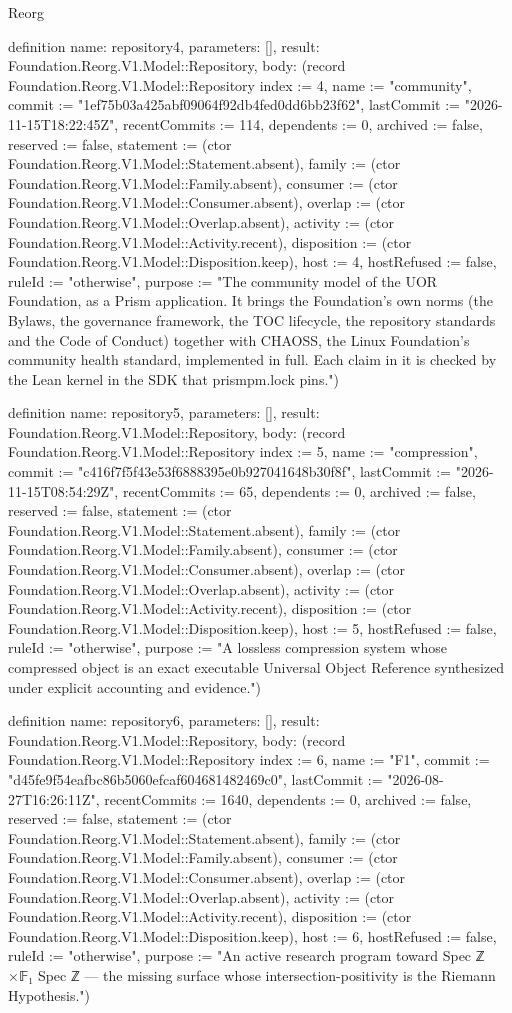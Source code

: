 \begin{lexlean}{Reorg}
\begin{semanticmodule}
definition{
  name: repository4,
  parameters: [],
  result: Foundation.Reorg.V1.Model::Repository,
  body: (record Foundation.Reorg.V1.Model::Repository {index := 4, name := "community", commit := "1ef75b03a425abf09064f92db4fed0dd6bb23f62", lastCommit := "2026-11-15T18:22:45Z", recentCommits := 114, dependents := 0, archived := false, reserved := false, statement := (ctor Foundation.Reorg.V1.Model::Statement.absent), family := (ctor Foundation.Reorg.V1.Model::Family.absent), consumer := (ctor Foundation.Reorg.V1.Model::Consumer.absent), overlap := (ctor Foundation.Reorg.V1.Model::Overlap.absent), activity := (ctor Foundation.Reorg.V1.Model::Activity.recent), disposition := (ctor Foundation.Reorg.V1.Model::Disposition.keep), host := 4, hostRefused := false, ruleId := "otherwise", purpose := "The community model of the UOR Foundation, as a Prism application. It brings the Foundation's own norms (the Bylaws, the governance framework, the TOC lifecycle, the repository standards and the Code of Conduct) together with CHAOSS, the Linux Foundation's community health standard, implemented in full. Each claim in it is checked by the Lean kernel in the SDK that prismpm.lock pins."})
}

definition{
  name: repository5,
  parameters: [],
  result: Foundation.Reorg.V1.Model::Repository,
  body: (record Foundation.Reorg.V1.Model::Repository {index := 5, name := "compression", commit := "c416f7f5f43e53f6888395e0b927041648b30f8f", lastCommit := "2026-11-15T08:54:29Z", recentCommits := 65, dependents := 0, archived := false, reserved := false, statement := (ctor Foundation.Reorg.V1.Model::Statement.absent), family := (ctor Foundation.Reorg.V1.Model::Family.absent), consumer := (ctor Foundation.Reorg.V1.Model::Consumer.absent), overlap := (ctor Foundation.Reorg.V1.Model::Overlap.absent), activity := (ctor Foundation.Reorg.V1.Model::Activity.recent), disposition := (ctor Foundation.Reorg.V1.Model::Disposition.keep), host := 5, hostRefused := false, ruleId := "otherwise", purpose := "A lossless compression system whose compressed object is an exact executable Universal Object Reference synthesized under explicit accounting and evidence."})
}

definition{
  name: repository6,
  parameters: [],
  result: Foundation.Reorg.V1.Model::Repository,
  body: (record Foundation.Reorg.V1.Model::Repository {index := 6, name := "F1", commit := "d45fe9f54eafbc86b5060efcaf604681482469c0", lastCommit := "2026-08-27T16:26:11Z", recentCommits := 1640, dependents := 0, archived := false, reserved := false, statement := (ctor Foundation.Reorg.V1.Model::Statement.absent), family := (ctor Foundation.Reorg.V1.Model::Family.absent), consumer := (ctor Foundation.Reorg.V1.Model::Consumer.absent), overlap := (ctor Foundation.Reorg.V1.Model::Overlap.absent), activity := (ctor Foundation.Reorg.V1.Model::Activity.recent), disposition := (ctor Foundation.Reorg.V1.Model::Disposition.keep), host := 6, hostRefused := false, ruleId := "otherwise", purpose := "An active research program toward Spec ℤ ×{𝔽₁} Spec ℤ — the missing surface whose intersection-positivity is the Riemann Hypothesis."})
}


\end{semanticmodule}
\end{lexlean}

